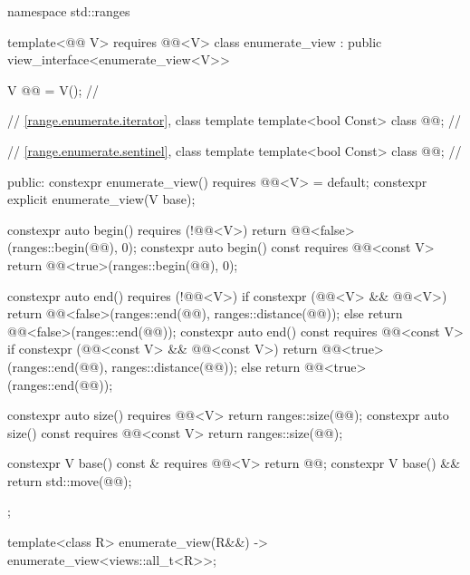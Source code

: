 %
%
%
\begin{codeblock}
namespace std::ranges {
  template<@@ V>
    requires @@<V>
  class enumerate_view : public view_interface<enumerate_view<V>> {
    V @@ = V();                                    // \expos

    // \ref{range.enumerate.iterator}, class template 
    template<bool Const>
      class @@;                                 // \expos

    // \ref{range.enumerate.sentinel}, class template 
    template<bool Const>
      class @@;                                 // \expos

  public:
    constexpr enumerate_view() requires @@<V> = default;
    constexpr explicit enumerate_view(V base);

    constexpr auto begin() requires (!@@<V>)
    { return @@<false>(ranges::begin(@@), 0); }
    constexpr auto begin() const requires @@<const V>
    { return @@<true>(ranges::begin(@@), 0); }

    constexpr auto end() requires (!@@<V>) {
      if constexpr (@@<V> && @@<V>)
        return @@<false>(ranges::end(@@), ranges::distance(@@));
      else
        return @@<false>(ranges::end(@@));
    }
    constexpr auto end() const requires @@<const V> {
      if constexpr (@@<const V> && @@<const V>)
        return @@<true>(ranges::end(@@), ranges::distance(@@));
      else
        return @@<true>(ranges::end(@@));
    }

    constexpr auto size() requires @@<V>
    { return ranges::size(@@); }
    constexpr auto size() const requires @@<const V>
    { return ranges::size(@@); }

    constexpr V base() const & requires @@<V> { return @@; }
    constexpr V base() && { return std::move(@@); }
  };

  template<class R>
    enumerate_view(R&&) -> enumerate_view<views::all_t<R>>;
}
\end{codeblock}

